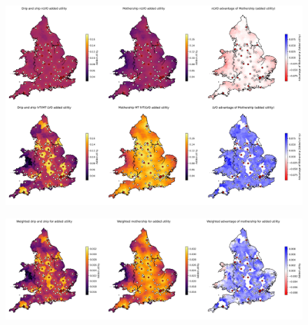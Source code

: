 \begin{figure}
\centering
\includegraphics[width=1.0\textwidth]{./maps/added_utility_six_in_one}
\caption{}
\label{fig:added_utility_six_in_one}
\end{figure}

\begin{figure}
\centering
\includegraphics[width=1.0\textwidth]{./maps/added_utility_weighted_results}
\caption{}
\label{fig:added_utility_six_in_one}
\end{figure}